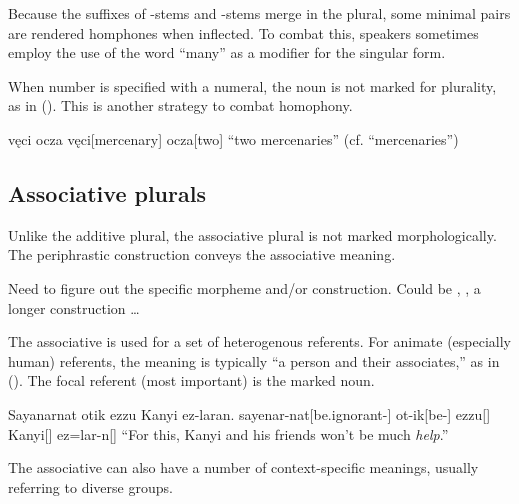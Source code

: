 Because the suffixes of -stems and -stems merge in the plural, some minimal pairs are rendered homphones when inflected. To combat this, speakers sometimes employ the use of the word  “many” as a modifier for the singular form.

When number is specified with a numeral, the noun is not marked for plurality, as in (\nextx). This is another strategy to combat homophony.

\begin{gloss}
    \begingl
        \glpreamble vęci ocza \endpreamble
            vęci[mercenary]
            ocza[two]
        \glft “two mercenaries”
        \trailingcitation (cf.  “mercenaries”)
    \endgl
\end{gloss}

\subsection{Associative plurals}
Unlike the additive plural, the associative plural is not marked morphologically. The periphrastic construction  conveys the associative meaning. 

\begin{kaobox}
Need to figure out the specific morpheme and/or construction. Could be , , a longer construction \dots
\end{kaobox}

The associative is used for a set of heterogenous referents. For animate (especially human) referents, the meaning is typically “a person and their associates,” as in (\nextx). The focal referent (\ie most important) is the marked noun.

\begin{gloss}
    \begingl
        \glpreamble Sayanarnat otik ezzu Kanyi ez-laran. \endpreamble
            sayenar-nat[be.ignorant-]
            ot-ik[be-]
            ezzu[]
            Kanyi[]
            ez=lar-n[]
        \glft “For this, Kanyi and his friends won't be much \emph{help}.”
    \endgl
\end{gloss}

The associative can also have a number of context-specific meanings, usually referring to diverse groups.


